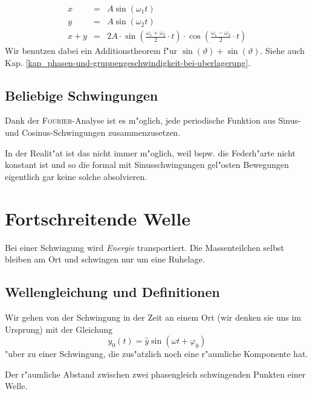\begin{eqnarray}
\nonumber
   x &=& A \sin(\omega_1 t)\\
\nonumber
   y &=& A \sin(\omega_2 t)\\
   \label{eq:146}
   x+y &=& 2A \cdot \sin\left ( \frac{\omega_1 + \omega_2}{2} \cdot t \right
   ) \cdot \cos \left ( \frac{\omega_1 - \omega_2}{2}\cdot t \right )
\end{eqnarray}
Wir benutzen dabei ein Additionstheorem f"ur $\sin(\vartheta) +
\sin(\vartheta)$.  Siehe auch
Kap. \ref{kap_phasen-und-gruppengeschwindigkeit-bei-uberlagerung}.



\subsection{Beliebige Schwingungen}
\label{kap_beliebige-schwingungen}

Dank der \textsc{Fourier}-Analyse ist es m"oglich, jede periodische
Funktion aus Sinus- und Cosinus-Schwingungen zusammenzusetzen.

In der Realit"at ist das nicht immer m"oglich, weil bspw. die Federh"arte
nicht konstant ist und so die formal mit Sinusschwingungen gel"osten
Bewegungen eigentlich gar keine solche absolvieren.









\section{Fortschreitende Welle}
\label{kap_fortschreitende-welle}


\begin{Wichtig}
   Bei einer Schwingung wird \emph{Energie} transportiert. Die
   Massenteilchen selbst bleiben am Ort und schwingen nur um eine
   Ruhelage.
\end{Wichtig}


\subsection{Wellengleichung und Definitionen}
\label{kap_wellengleichung-und-definitionen}



Wir gehen von der Schwingung in der Zeit an einem Ort (wir denken sie
uns im Ursprung) mit der Gleichung 
\begin{equation}
   \label{eq:147}
   y_0(t) = \hat y \sin(\omega t + \varphi_0)
\end{equation}
"uber zu einer Schwingung, die zus"atzlich noch eine r"aumliche
Komponente hat.
\begin{Def}
Der r"aumliche Abstand zwischen zwei phasengleich schwingenden Punkten
einer Welle.
\end{Def}

